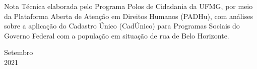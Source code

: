 \documentclass[12pt]{article}
\begin{document}
\hfill%
\begin{minipage}{9cm}
\vspace{7cm}
Nota Técnica elaborada pelo Programa Polos de Cidadania da UFMG, por meio da Plataforma Aberta de Atenção em Direitos Humanos (PADHu), com análises sobre a aplicação do Cadastro Único (CadÚnico) para Programas Sociais do Governo Federal com a população em situação de rua de Belo Horizonte.
\end{minipage}

\begin{center}
\vspace{8cm}
{\normalsize{Setembro}}\\
{\normalsize{2021}}\\
\end{center}
\newpage

\end{document}
